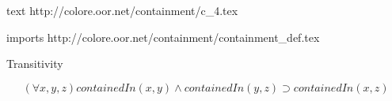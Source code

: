 text http://colore.oor.net/containment/c_4.tex

imports http://colore.oor.net/containment/containment_def.tex

Transitivity

\begin{equation}
(\forall x,y,z) containedIn(x,y) \wedge containedIn(y,z) \supset containedIn(x,z)
\end{equation}
